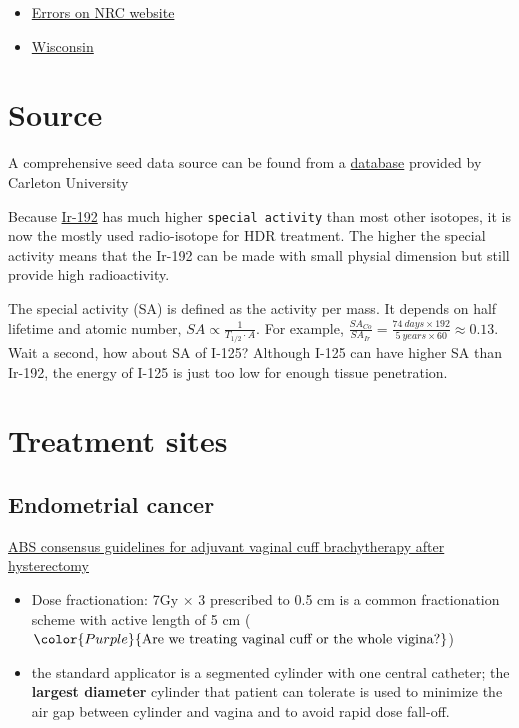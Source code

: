\documentclass[]{book}
\providecommand{\tightlist}{%
  \setlength{\itemsep}{0pt}\setlength{\parskip}{0pt}}
\theoremstyle{definition}
\theoremstyle{definition}
\theoremstyle{definition}
\theoremstyle{remark}
\begin{document}
\begin{itemize}
\tightlist
\item
  \href{http://www.nrc.gov/reading-rm/doccollections/nuregs/brochures/br0117/}{Errors
  on NRC website}
\item
  \href{(http://chapter.aapm.org/GLC/media/2011/tollenaar.pdf)}{Wisconsin}
\end{itemize}

\section{Source}\label{source}

A comprehensive seed data source can be found from a
\href{http://www.physics.carleton.ca/clrp/seed_database}{database}
provided by Carleton University

Because
\href{https://www.estro.org/about/governance-organisation/committees-activities/tg43-ir-192-hdr}{Ir-192}
has much higher \texttt{special\ activity} than most other isotopes, it
is now the mostly used radio-isotope for HDR treatment. The higher the
special activity means that the Ir-192 can be made with small physial
dimension but still provide high radioactivity.

The special activity (SA) is defined as the activity per mass. It
depends on half lifetime and atomic number,
\(SA \propto \frac{1}{T_{1/2}\cdot A}\). For example,
\(\frac{SA_{Co}}{SA_{Ir}} = \frac{74\ days \times 192}{5\ years \times 60} \approx 0.13\).
Wait a second, how about SA of I-125? Although I-125 can have higher SA
than Ir-192, the energy of I-125 is just too low for enough tissue
penetration.

\section{Treatment sites}\label{treatment-sites-1}

\subsection{Endometrial cancer}\label{endometrial-cancer}

\href{https://www.sciencedirect.com/science/article/pii/S1538472111003874?via\%3Dihub}{ABS
consensus guidelines for adjuvant vaginal cuff brachytherapy after
hysterectomy}

\begin{itemize}
\tightlist
\item
  Dose fractionation: 7Gy \(\times\) 3 prescribed to 0.5 cm is a common
  fractionation scheme with active length of 5 cm
  (\(\color{Purple} {\text{Are we treating vaginal cuff or the whole vigina?}}\))
\item
  the standard applicator is a segmented cylinder with one central
  catheter; the \textbf{largest diameter} cylinder that patient can
  tolerate is used to minimize the air gap between cylinder and vagina
  and to avoid rapid dose fall-off.
\end{itemize}
\end{document}
